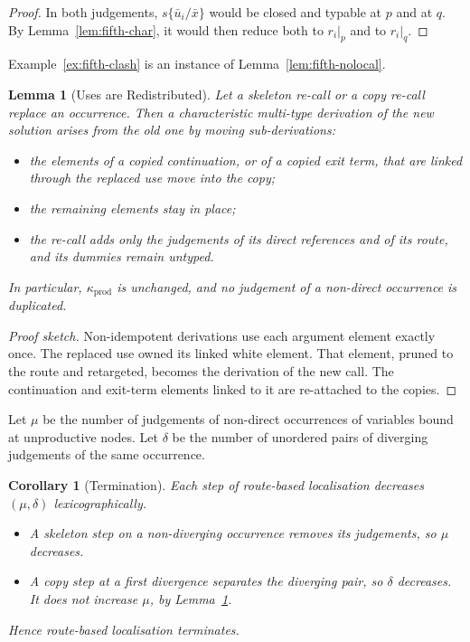 \documentclass[10pt,a4paper]{article}
\theoremstyle{plain}%
\newtheorem{lemma}[theorem]{Lemma}
\newtheorem{corollary}[theorem]{Corollary}
\begin{document}
\begin{proof}
In both judgements, $s\{\bar u_i/\bar x\}$ would be closed and typable at $p$ and at $q$.
By Lemma~\ref{lem:fifth-char}, it would then reduce both to $r_i|_p$ and to $r_i|_q$.
\end{proof}

Example~\ref{ex:fifth-clash} is an instance of Lemma~\ref{lem:fifth-nolocal}.

\begin{lemma}[Uses are Redistributed]\label{lem:fifth-redistribute}
Let a skeleton re-call or a copy re-call replace an occurrence.
Then a characteristic multi-type derivation of the new solution arises from the old one by moving sub-derivations:
\begin{itemize}
\item the elements of a copied continuation, or of a copied exit term, that are linked through the replaced use move into the copy;
\item the remaining elements stay in place;
\item the re-call adds only the judgements of its direct references and of its route, and its dummies remain untyped.
\end{itemize}
In particular, $\kappa_{\mathrm{prod}}$ is unchanged, and no judgement of a non-direct occurrence is duplicated.
\end{lemma}

\begin{proof}[Proof sketch]
Non-idempotent derivations use each argument element exactly once.
The replaced use owned its linked white element.
That element, pruned to the route and retargeted, becomes the derivation of the new call.
The continuation and exit-term elements linked to it are re-attached to the copies.
\end{proof}

Let $\mu$ be the number of judgements of non-direct occurrences of variables bound at unproductive nodes.
Let $\delta$ be the number of unordered pairs of diverging judgements of the same occurrence.

\begin{corollary}[Termination]\label{cor:fifth-termination}
Each step of route-based localisation decreases $(\mu, \delta)$ lexicographically.
\begin{itemize}
\item A skeleton step on a non-diverging occurrence removes its judgements, so $\mu$ decreases.
\item A copy step at a first divergence separates the diverging pair, so $\delta$ decreases.
It does not increase $\mu$, by Lemma~\ref{lem:fifth-redistribute}.
\end{itemize}
Hence route-based localisation terminates.
\end{corollary}
\end{document}
